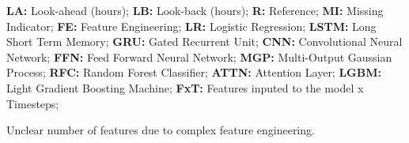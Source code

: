 \begin{table}[h!]
    \begin{tablenotes}
        \footnotesize
        \item \textbf{LA:} Look-ahead (hours); \textbf{LB:} Look-back (hours); \textbf{R:} Reference; \textbf{MI:} Missing Indicator; \textbf{FE:} Feature Engineering; \textbf{LR:} Logistic Regression; \textbf{LSTM:} Long Short Term Memory; \textbf{GRU:} Gated Recurrent Unit; \textbf{CNN:} Convolutional Neural Network; \textbf{FFN:} Feed Forward Neural Network; \textbf{MGP:} Multi-Output Gaussian Process; \textbf{RFC:} Random Forest Classifier; \textbf{ATTN:} Attention Layer; \textbf{LGBM:} Light Gradient Boosting Machine; \textbf{FxT:} Features inputed to the model x Timesteps; 
        \item[] \textsuperscript{\textdagger} Unclear number of features due to complex feature engineering.
    \end{tablenotes}

    
\label{tab:tblr-performance-ml-part3}
\end{table}
